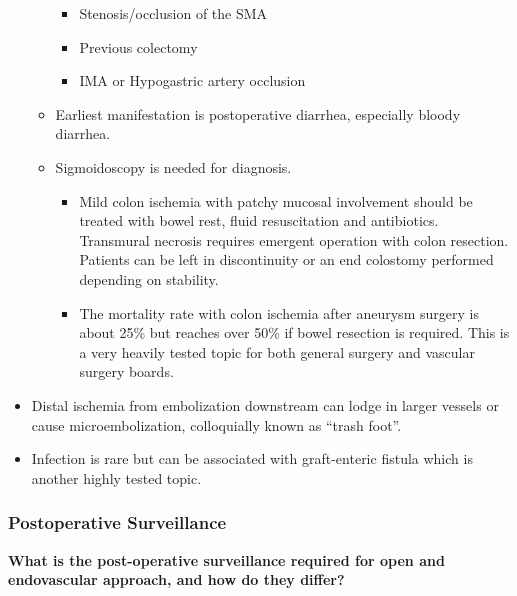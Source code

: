 \documentclass[
]{book}
\begin{document}
\begin{itemize}
\begin{itemize}
    \begin{itemize}
    \item
      Stenosis/occlusion of the SMA
    \item
      Previous colectomy
    \item
      IMA or Hypogastric artery occlusion
    \end{itemize}
  \item
    Earliest manifestation is postoperative diarrhea, especially
    bloody diarrhea.
  \item
    Sigmoidoscopy is needed for diagnosis.

    \begin{itemize}
    \item
      Mild colon ischemia with patchy mucosal involvement should
      be treated with bowel rest, fluid resuscitation and
      antibiotics. Transmural necrosis requires emergent operation
      with colon resection. Patients can be left in discontinuity
      or an end colostomy performed depending on stability.
    \item
      The mortality rate with colon ischemia after aneurysm
      surgery is about 25\% but reaches over 50\% if bowel resection
      is required.\citep{brewsterIntestinalIschemiaComplicating1991}
      This is a very heavily tested topic for both general surgery
      and vascular surgery boards.
    \end{itemize}
  \end{itemize}
\item
  Distal ischemia from embolization downstream can lodge in larger
  vessels or cause microembolization, colloquially known as ``trash
  foot''.
\item
  Infection is rare but can be associated with graft-enteric fistula
  which is another highly tested topic.\citep{fatima2013, oderich2011, smeds2016}
\end{itemize}

\hypertarget{postoperative-surveillance}{%
\subsubsection{Postoperative Surveillance}\label{postoperative-surveillance}}

\textbf{What is the post-operative surveillance required for open and
endovascular approach, and how do they differ?}
\citep{mooreVascularEndovascularSurgery2019}
\end{document}
